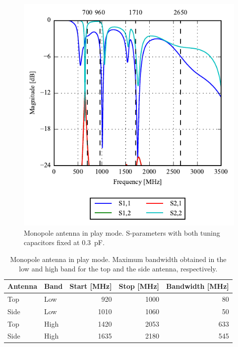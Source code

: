 \begin{figure}[htbp]
    \centering
    \includegraphics{img/tech_sol/monopole/play_mode/sparams_play.pdf}
    \caption{Monopole antenna in play mode. S-parameters with both tuning capacitors fixed at \SI{0.3}{pF}.}
    \label{fig:mono_play_sparam_data}
\end{figure}

\begin{table}[htbp]
    \centering
    \begin{tabular}{|l|l|r|r|r|}
      \hline
      Antenna & Band & Start [MHz] & Stop [MHz] & Bandwidth [MHz] \\
      \hline
      Top     & Low  & 920 & 1000 &  80 \\
      Side    & Low  & 1010 & 1060 & 50 \\
      \hline
      Top     & High & 1420 & 2053 & 633 \\
      Side    & High & 1635 & 2180 & 545 \\
      \hline
    \end{tabular}
    \caption{Monopole antenna in play mode. Maximum bandwidth obtained in the low and high band for the top and the side antenna, respectively.}    \label{tab:bw_sol1play}
  \end{table}

